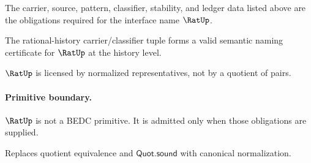 \begin{definition}
\label{def:rat-certificate-obligations}
The carrier, source, pattern, classifier, stability, and ledger data listed above are the obligations required for the interface name $\RatUp$.
\end{definition}

\begin{theorem}
\label{thm:concrete-rat-namecert}
The rational-history carrier/classifier tuple forms a valid semantic naming certificate for $\RatUp$ at the history level.
\end{theorem}

\begin{corollary}
\label{cor:rat-licensed-not-primitive}
$\RatUp$ is licensed by normalized representatives, not by a quotient of pairs.
\end{corollary}

\paragraph{Primitive boundary.}
$\RatUp$ is not a BEDC primitive. It is admitted only when those obligations are supplied.

\begin{remark}
\label{rem:rat-zero-axiom-note}
Replaces quotient equivalence and $\mathsf{Quot.sound}$ with canonical normalization.
\end{remark}
